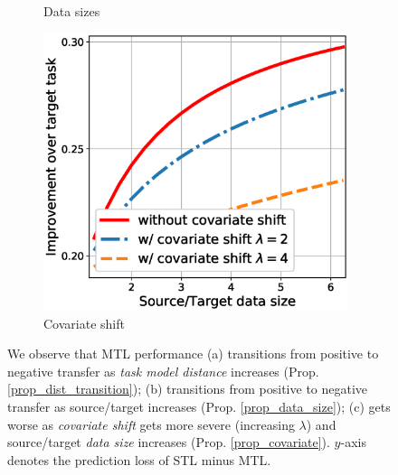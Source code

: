 \begin{figure}[!t]
\begin{subfigure}[b]{0.32\textwidth}
		\caption{Data sizes}
		\label{fig_size}
	\end{subfigure}\hfill
	\begin{subfigure}[b]{0.32\textwidth}
		\centering
		\includegraphics[width=0.98\textwidth]{figures/complementary.eps}
		\caption{Covariate shift}
		\label{fig_covariate}
	\end{subfigure}
	\caption{%
	We observe that MTL performance
	(a) transitions from positive to negative transfer as \textit{task model distance} increases (Prop. \ref{prop_dist_transition});
	(b) transitions from positive to negative transfer as source/target  increases (Prop. \ref{prop_data_size});
	(c) gets worse as \textit{covariate shift} gets more severe (increasing $\lambda$) and source/target \textit{data size} increases (Prop. \ref{prop_covariate}).
	$y$-axis denotes the prediction loss of STL minus MTL.}
	\label{fig_model_shift_phasetrans}
	\vspace{-0.2in}
\end{figure}




